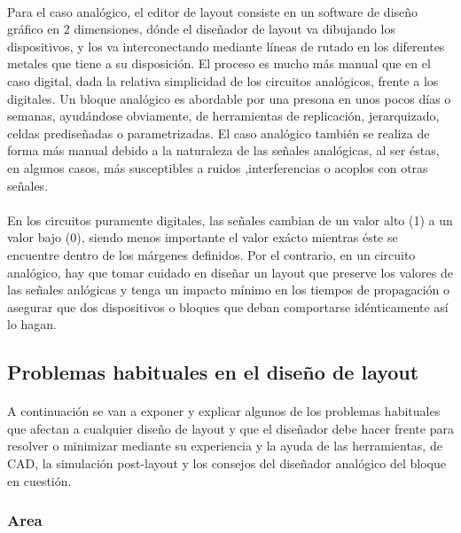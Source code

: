 \paragraph{} Para el caso analógico, el editor de layout consiste en un software
de diseño gráfico en 2 dimensiones, dónde el diseñador de layout va dibujando los
dispositivos, y los va interconectando mediante líneas de rutado en los diferentes
metales que tiene a su disposición. El proceso es mucho más manual que en el caso
digital, dada la relativa simplicidad de los circuitos analógicos, frente a los
digitales. Un bloque analógico es abordable por una presona en unos pocos días o
semanas, ayudándose obviamente, de herramientas de replicación, jerarquizado, celdas
prediseñadas o parametrizadas. El caso analógico también se realiza de forma más
manual debido a la naturaleza de las señales analógicas, al ser éstas, en algunos casos,
más susceptibles a ruidos ,interferencias o acoplos con otras señales.

\paragraph{} En los circuitos puramente digitales, las señales cambian de un
valor alto (1) a un valor bajo (0), siendo menos importante el valor exácto
mientras éste se encuentre dentro de los márgenes definidos. Por el contrario,
en un circuito analógico, hay que tomar cuidado en diseñar un layout que preserve
los valores de las señales anlógicas y tenga un impacto mínimo en los tiempos de
propagación o asegurar que dos dispositivos o bloques que deban comportarse idénticamente
así lo hagan.

\subsection{Problemas habituales en el diseño de layout}

\paragraph{} A continuación se van a exponer y explicar algunos de los problemas habituales que
afectan a cualquier diseño de layout y que el diseñador debe hacer frente para
resolver o minimizar mediante su experiencia y la ayuda de las herramientas, de CAD,
la simulación post-layout y los consejos del diseñador analógico del bloque en cuestión.

\subsubsection{Area}

